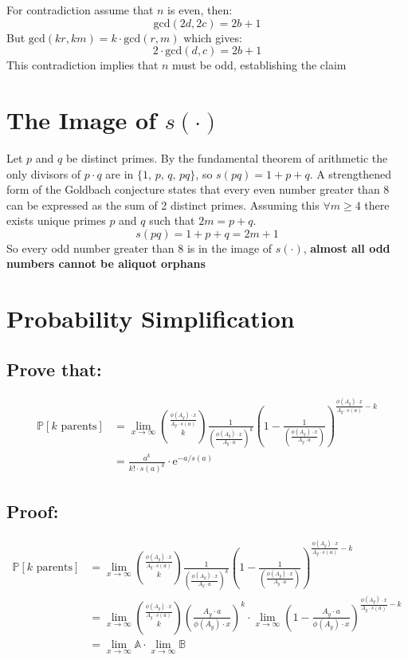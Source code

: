 \documentclass[12pt]{amsart}
\theoremstyle{definition}
\numberwithin{equation}{section}
\begin{document}
    For contradiction assume that $n$ is even, then:
     $$\text{gcd}(2d, 2c) = 2b+1$$
    But $\text{gcd}(kr, km) = k\cdot \text{gcd}(r, m)$  which gives: 
    $$2 \cdot \text{gcd}(d, c) = 2b+1$$
    This contradiction implies that $n$ must be odd, establishing the claim

\section{The Image of $s(\cdot)$}
Let $p$ and $q$ be distinct primes. By the fundamental theorem of arithmetic the only divisors of $p \cdot q$ are in $\{1\text{, } p\text{, } q \text{, } pq\}$, so $s(pq) = 1 + p + q$.
A strengthened form of the Goldbach conjecture states that every even number greater than 8 can be expressed as the sum of 2 distinct primes.
Assuming this $\forall m \geq 4$ there exists unique primes $p$ and $q$ such that $2m = p + q$. $$s(pq) = 1 + p + q = 2m +1 $$
So every odd number greater than 8 is in the image of $s(\cdot)$,  \textbf{almost all odd numbers cannot be aliquot orphans}

\section{Probability Simplification}
\subsection*{Prove that:}\begin{align*}
      \mathbb{P}[k \text{ parents}] &=  \lim_{x \to \infty}{\frac{\phi(A_y) \cdot x}{A_y \cdot s(a)} \choose k } \frac{1}{\left(\frac{\phi(A_y) \cdot x}{ A_y \cdot a}\right)^k} \left(1- \frac{1}{\left(\frac{\phi(A_y) \cdot x}{ A_y \cdot a}\right)}\right)^{\frac{\phi(A_y) \cdot x}{A_y \cdot s(a)  } -k}\\
       &= \frac{a^{k}}{k! \cdot s(a)^k} \cdot \text{e}^{-a/s(a)}
   \end{align*} 
   
\subsection*{Proof:} \begin{align*}
     \mathbb{P}[k \text{ parents}] &=  \lim_{x \to \infty}{\frac{\phi(A_y) \cdot x}{A_y \cdot s(a)} \choose k } \frac{1}{\left(\frac{\phi(A_y) \cdot x}{ A_y \cdot a}\right)^k} \left(1- \frac{1}{\left(\frac{\phi(A_y) \cdot x}{ A_y \cdot a}\right)}\right)^{\frac{\phi(A_y) \cdot x}{A_y \cdot s(a)  } -k}\\
     &=  \lim_{x \to \infty}{\frac{\phi(A_y) \cdot x}{A_y \cdot s(a)} \choose k } \left(\frac{A_y \cdot a}{\phi(A_y) \cdot x}\right)^k \cdot \lim_{x \to \infty}\left(1- \frac{A_y \cdot a}{\phi(A_y) \cdot x}\right)^{\frac{\phi(A_y) \cdot x}{A_y \cdot s(a)  } -k}\\
     &=  \lim_{x \to \infty}\mathbb{A}  \cdot \lim_{x \to \infty} \mathbb{B}
\end{align*}
   
\end{document}

